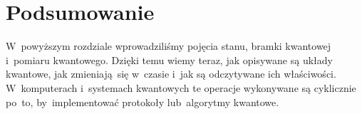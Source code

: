 \section{Podsumowanie}
W~powyższym rozdziale wprowadziliśmy pojęcia stanu, bramki kwantowej i~pomiaru kwantowego. Dzięki temu wiemy teraz,
jak opisywane są układy kwantowe, jak zmieniają~się w~czasie i~jak są
odczytywane ich właściwości. W~komputerach i~systemach kwantowych te operacje wykonywane są
cyklicznie po~to, by~implementować protokoły lub~algorytmy kwantowe.


